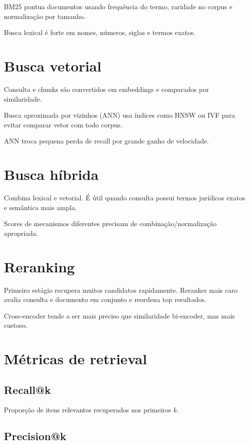 BM25 pontua documentos usando frequência do termo, raridade no corpus e normalização por tamanho.

Busca lexical é forte em nomes, números, siglas e termos exatos.

\section{Busca vetorial}

Consulta e chunks são convertidos em embeddings e comparados por similaridade.

Busca aproximada por vizinhos (ANN) usa índices como HNSW ou IVF para evitar comparar vetor com todo corpus.

ANN troca pequena perda de recall por grande ganho de velocidade.

\section{Busca híbrida}

Combina lexical e vetorial. É útil quando consulta possui termos jurídicos exatos e semântica mais ampla.

Scores de mecanismos diferentes precisam de combinação/normalização apropriada.

\section{Reranking}

Primeiro estágio recupera muitos candidatos rapidamente. Reranker mais caro avalia consulta e documento em conjunto e reordena top resultados.

Cross-encoder tende a ser mais preciso que similaridade bi-encoder, mas mais custoso.

\section{Métricas de retrieval}

\subsection{Recall@k}

Proporção de itens relevantes recuperados nos primeiros $k$.

\subsection{Precision@k}

